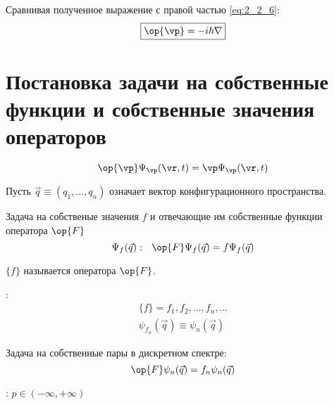 Сравнивая полученное выражение с правой частью \eqref{eq:2_2_6}:
\begin{equation}
\label{eq:2_2_7}
\boxed{ \op{\vp} = -i\hbar\nabla }
\end{equation}

\section{Постановка задачи на собственные функции и собственные значения операторов}

\begin{equation}
\label{eq:2_3_1}
\op{\vp} \Psi_\vp(\vr,t) = \vp \Psi_\vp(\vr,t)
\end{equation}

Пусть $\vec{q}\equiv(q_1,...,q_n)$ означает вектор конфигурационного пространства.

Задача на собственые значения $f$ и отвечающие им собственные функции оператора $\op{F}$ 
\begin{equation}
\label{eq:2_3_2}
\Psi_f(\vec{q}):~~ \op{F}\Psi_f(\vec{q}) = f \Psi_f(\vec{q})
\end{equation}

\begin{defn}
$\{f\}$ называется  оператора $\op{F}$.
\end{defn}

:
$$
\begin{gathered}
\{f\} = f_1,f_2,...,f_n,... \\
\psi_{f_n}(\vec{q}) \equiv \psi_n(\vec{q})
\end{gathered}
$$

Задача на собственные пары в дискретном спектре:
\begin{equation}
\label{eq:2_3_3}
\op{F} \psi_n(\vec{q}) = f_n \psi_n(\vec{q})
\end{equation}

: $p \in (-\infty, +\infty)$